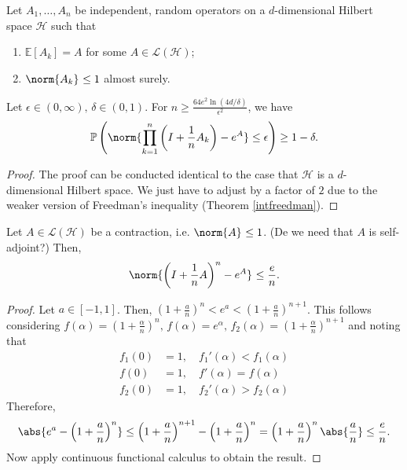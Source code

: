 \begin{corl}[]
    \label{worstcaseexpsep}
    Let \( A_1, \dots, A_n \) be independent, random operators on a \( d \)-dimensional Hilbert space \( \mathcal{H} \) such that 
    \begin{enumerate}[1)]
      \item \( \mathbb{E}\left[A_k\right] = A \) for some \( A \in \mathcal{L}(\mathcal{H}) \);
      \item \( \norm{A_k}_{} \leq  1 \) almost surely.
    \end{enumerate}
    Let \( \epsilon \in (0,\infty),\, \delta \in (0,1) \). For \( n \geq \frac{64e^{2} \operatorname{ln}(4d/\delta)}{\epsilon^{2}} \), we have 
  \[ \mathbb{P}\left(\norm{\prod_{k=1}^{n} \left(I+\frac{1}{n}A_k\right)-e^{A}}\leq\epsilon\right)  \geq 1-\delta.\]

\end{corl}
\begin{proof}
  The proof can be conducted identical to the case that \( \mathcal{H} \) is a \( d \)-dimensional Hilbert space. We just have to adjust by a factor of \( 2 \) due to the weaker version of Freedman's inequality (Theorem \ref{intfreedman}).
\end{proof}



\begin{lem}[]
  \label{expproderror}
    Let \( A \in \mathcal{L}(\mathcal{H}) \) be a contraction, i.e. \( \norm{A}_{} \leq 1 \). (De we need that \( A \) is self-adjoint?) Then, 
    \[ \norm{ \left(I+\frac{1}{n}A\right)^{n}- e^{A}}_{} \leq \frac{e}{n}. \]
\end{lem}

\begin{proof}
  Let \(a \in [-1,1] \). Then, \( \left(1+ \frac{a}{n}\right)^{n} < e^{a} < \left(1+\frac{a}{n}\right)^{n+1} \). This follows considering \( f(\alpha)= \left(1+\frac{\alpha}{n}\right)^{n},\, f(\alpha)=e^{\alpha},\, f_2(\alpha)=\left(1+\frac{\alpha}{n}\right)^{n+1} \) and noting that 
  \begin{align*}
    f_1(0) &=1,\quad f_1'(\alpha)< f_1(\alpha) \\
    f(0) &=1, \quad f'(\alpha) = f(\alpha) \\
    f_2(0)&=1, \quad f_2'(\alpha)> f_2(\alpha)
  \end{align*}
 Therefore, 
 \[ \abs{e^{a}- \left(1+\frac{a}{n}\right)^{n}} \leq \left(1+\frac{a}{n}\right)^{n+1}- \left(1+\frac{a}{n}\right)^{n} = \left(1+\frac{a}{n}\right)^{n} \abs{\frac{a}{n}} \leq \frac{e}{n}. \]
 Now apply continuous functional calculus to obtain the result.
\end{proof}


